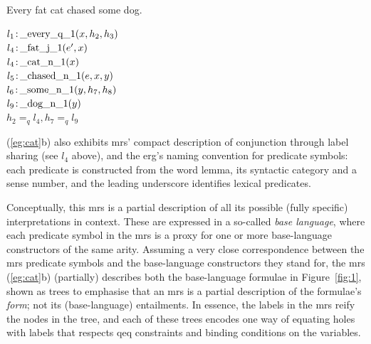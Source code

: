 \begin{examples}
\item   \label{eg:cat}
\begin{subexamples}
\item
Every fat cat chased some dog.
\item   $l_1\colon\!\mbox{\_every\_q\_1}(x,h_2,h_3)$\\
$l_4\colon\!\mbox{\_fat\_j\_1}(e',x)$\\
$l_4\colon\!\mbox{\_cat\_n\_1}(x)$\\
$l_5\colon\!\mbox{\_chased\_n\_1}(e,x,y)$\\
$l_6\colon\!\mbox{\_some\_n\_1}(y,h_7,h_8)$\\
$l_9\colon\!\mbox{\_dog\_n\_1}(y)$\\
$h_2 =_q l_4, h_7 =_q l_9$
\end{subexamples}
\end{examples}
(\ref{eg:cat}b) also exhibits {\sc mrs}' compact description of
conjunction through label sharing (see $l_4$ above), and the {\sc
  erg}'s naming convention for predicate symbols: each predicate is
constructed from the word lemma, its syntactic category and a sense
number, and the leading underscore identifies lexical predicates.

Conceptually, this {\sc mrs} is a partial description of all its
possible (fully specific) interpretations in context.  
These are expressed in a so-called {\em base language}, where each
predicate symbol in the {\sc mrs} is a proxy for one or more
base-language constructors of the same arity.
Assuming a very close
correspondence between the {\sc mrs} predicate symbols and the
base-language constructors they 
stand for, the {\sc mrs}
(\ref{eg:cat}b) (partially) describes both the base-language formulae in
Figure~\ref{fig:1}, shown as trees to emphasise that an {\sc mrs} is a
partial description of the formulae's {\em form}; not its
(base-language) entailments. 
In essence, the labels in the {\sc mrs} reify the
nodes in the tree, and each of these trees encodes one way of equating
holes with labels that respects qeq constraints and binding conditions
on the variables.

